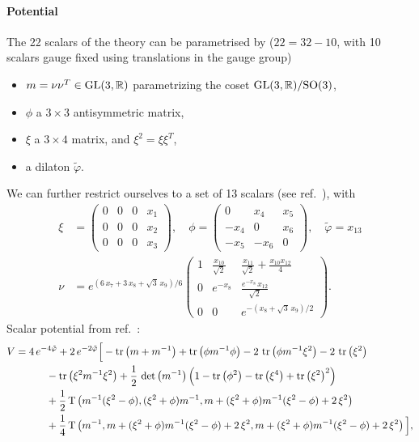 \documentclass[11pt]{article}
\begin{document}
\paragraph{Potential}
The 22 scalars of the theory can be parametrised by ($22 = 32 - 10$, with 10 scalars gauge fixed using translations in the gauge group)
\begin{itemize}[label=\textbullet]
	\item $m = \nu\nu^{T}\in{\rm GL}(3,\mathbb{R})$ parametrizing the coset ${\rm GL}(3,\mathbb{R})/{\rm SO}(3)$,
	\item $\phi$ a $3\times3$ antisymmetric matrix,
	\item $\xi$ a $3\times4$ matrix, and $\xi^{2} = \xi \xi^{T}$,
	\item a dilaton $\tilde{\varphi}$.
\end{itemize}
We can further restrict ourselves to a set of 13 scalars (see ref.~\cite{Eloy:2021fhc}), with
\begin{equation}
	\begin{aligned}
		\xi &= \begin{pmatrix}
					0 & 0 & 0 & x_{1} \\
					0 & 0 & 0 & x_{2} \\
					0 & 0 & 0 & x_{3}
				\end{pmatrix},
		\quad
		\phi = \begin{pmatrix}
					0 & x_{4} & x_{5} \\
					-x_{4} & 0 & x_{6} \\
					-x_{5} & -x_{6} & 0
				\end{pmatrix},
		\quad
		\tilde{\varphi} = x_{13} \\[5pt]
		\nu &= e^{(6\,x_{7}+3\,x_{8}+\sqrt{3}\,x_{9})/6}
				\begin{pmatrix}
					1 & \frac{x_{10}}{\sqrt{2}} & \frac{x_{11}}{\sqrt{2}} + \frac{x_{10}x_{12}}{4} \\
					0 & e^{-x_{8}} & \frac{e^{-x_{8}}\,x_{12}}{\sqrt{2}} \\
					0 & 0 & e^{-(x_{8}+\sqrt{3}\,x_{9})/2}
				\end{pmatrix}.
	\end{aligned}
\end{equation}
Scalar potential from ref.~\cite{Eloy:2021fhc}:
%
\begin{equation} \label{eq:scalarpotential}
	\begin{aligned}
 		V & = 4\,e^{-4\tilde\varphi}+2\,e^{-2\tilde\varphi}\Big[-\tr\left(m+m^{-1}\right)+\tr\left(\phi m^{-1}\phi\right) -2\,\tr\left(\phi m^{-1}\xi^{2}\right)-2\,\tr\left(\xi^{2}\right)\\
 		&\qquad\quad-\tr\left(\xi^{2}m^{-1}\xi^{2}\right)  +\frac{1}{2}\,\det\left(m^{-1}\right)\left(1-\tr\left(\phi^{2}\right)-\tr\left(\xi^{4}\right)+\tr\left(\xi^{2}\right)^{2}\right) \\
 		&\qquad\quad +\frac{1}{2}\,{\rm T}\left(m^{-1}(\xi^{2}-\phi),(\xi^{2}+\phi)m^{-1},m+(\xi^{2}+\phi)m^{-1}(\xi^{2}-\phi)+2\,\xi^{2}\right)\\
 		&\qquad\quad +\frac{1}{4}\,{\rm T}\left(m^{-1},m+(\xi^{2}+\phi)m^{-1}(\xi^{2}-\phi)+2\,\xi^{2},m+(\xi^{2}+\phi)m^{-1}(\xi^{2}-\phi)+2\,\xi^{2}\right)\Big], 
 	\end{aligned}
\end{equation}
\end{document}
